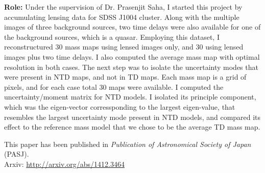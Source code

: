 {\bf Role:} Under the supervision of Dr. Prasenjit Saha, I started this project
by accumulating lensing data for SDSS J1004 cluster. Along with the multiple
images of three background sources, two time delays were also available for one 
of the background sources, which is a quasar. Employing this dataset, I reconstructured
30 mass maps using lensed images only, and 30 using lensed images plus two time
delays. I also computed the average mass map with optimal resolution in both
cases. The next step was to isolate the uncertainty modes that were present
in NTD maps, and not in TD maps. Each mass map is a grid of pixels, and for each
case total 30 maps were available. 
I computed the uncertainty/moment matrix for NTD models.
I isolated its principle component, which was the eigen-vector corressponding
to the largest eigen-value, that resembles the largest uncertainty
mode present in NTD models, and compared its effect to the reference 
mass model that we chose to be the average TD mass map. 

This paper has been published in {\it Publication of Astronomical Society of Japan} (PASJ). 
\\
Arxiv: \url{http://arxiv.org/abs/1412.3464}

\clearpage
